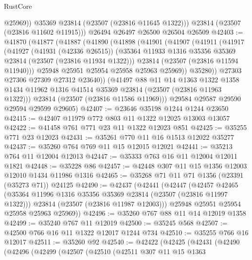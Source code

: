 \begin{lexlean}{RustCore}
\begin{coremodule}
            @25969))
        @35369
        @23814
        (@23507 (@23816 @11645 @1322)))
      @23814
      (@23507 (@23816 @11602 @11915)))
    @26494
    @26497
    @26500
    @26504
    @26509
@42403 := @41870
    (@41877
      (@41887
        (@41890
          (@41898
            (@41901
              (@41907
                (@41911
                  (@41917
                    (@41927
                      (@41931 (@42336 @26515))
                      (@35364 @11933 @1316 @35356 @35369 @23814 (@23507 (@23816 @11934 @1322)))
                      @23814
                      (@23507 (@23816 @11594 @11940)))
                    @25948
                    @25951
                    @25954
                    @25958
                    @25963
                    @25969))
                @35280))
            @27303
            @27306
            @27309
            @27312
            @23640))
        (@41497
          @88
          @11
          @14
          @1363
          @1322
          @1358
          @1434
          @11962
          @1316
          @41514
          @35369
          @23814
          (@23507 (@23816 @11963 @1322)))
        @23814
        (@23507 (@23816 @11586 @11969)))
      @29584
      @29587
      @29590
      @29594
      @29599
      @29605)
@42407 := @23646 @35198 @1244 @1244 @23650
@42415 := @42407 @11979 @772 @803 @11 @1322 @12025 @13003 @13057
@42422 := @41458 @761 @771 @23 @11 @1322 @12023 @851
@42425 := @35255 @771 @23 @12023
@42431 := @35261 @770 @11 @16 @1513 @12022 @35277
@42437 := @35260 @764 @769 @11 @15 @12015 @12021
@42441 := @35213 @764 @11 @12004 @12013
@42447 := @35333 @763 @16 @11 @12004 @12011 @1821
@42448 := @35228 @86
@42457 := @42448 @307 @11 @15 @1356 @12003 @12010 @1434 @11986 @1316
@42465 := @35268 @71 @11 @71 @1356 (@23391 (@35273 @71)) @24125
@42490 := @42437
    (@42441
      (@42447
        (@42457
          @42465
          (@35364 @11996 @1316 @35356 @35369 @23814 (@23507 (@23816 @11997 @1322)))
          @23814
          (@23507 (@23816 @11987 @12003)))
        @25948
        @25951
        @25954
        @25958
        @25963
        @25969))
@42496 := @35260 @767 @88 @11 @14 @12019 @1358
@42499 := @35240 @767 @11 @12019
@42500 := @35245 @568
@42507 := @42500 @766 @16 @11 @1322 @12017 @1244 @734
@42510 := @35255 @766 @16 @12017
@42511 := @35260 @92
@42540 := @42422
    (@42425
      (@42431
        (@42490
          (@42496
            (@42499
              (@42507
                (@42510
                  (@42511
                    @307
                    @11
                    @15
                    @1363

\end{coremodule}
\end{lexlean}
